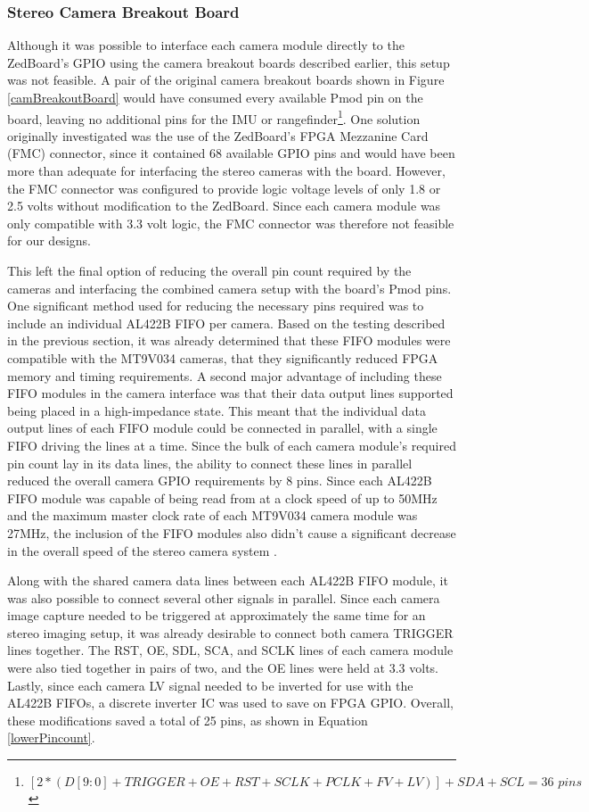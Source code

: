 \subsubsection{Stereo Camera Breakout Board}
Although it was possible to interface each camera module directly to the ZedBoard's GPIO using the camera breakout boards described earlier, this setup was not feasible. A pair of the original camera breakout boards shown in Figure \ref{camBreakoutBoard} would have consumed every available Pmod pin on the board, leaving no additional pins for the IMU or rangefinder\footnote{$[2*(D[9:0]+TRIGGER+OE+RST+SCLK+PCLK+FV+LV)]+SDA+SCL = 36\,\,pins$}. One solution originally investigated was the use of the ZedBoard's FPGA Mezzanine Card (FMC) connector, since it contained 68 available GPIO pins and would have been more than adequate for interfacing the stereo cameras with the board. However, the FMC connector was configured to provide logic voltage levels of only 1.8 or 2.5 volts without modification to the ZedBoard. Since each camera module was only compatible with 3.3 volt logic, the FMC connector was therefore not feasible for our designs.
\par
This left the final option of reducing the overall pin count required by the cameras and interfacing the combined camera setup with the board's Pmod pins. One significant method used for reducing the necessary pins required was to include an individual AL422B FIFO per camera. Based on the testing described in the previous section, it was already determined that these FIFO modules were compatible with the MT9V034 cameras, that they significantly reduced FPGA memory and timing requirements. A second major advantage of including these FIFO modules in the camera interface was that their data output lines supported being placed in a high-impedance state. This meant that the individual data output lines of each FIFO module could be connected in parallel, with a single FIFO driving the lines at a time. Since the bulk of each camera module's required pin count lay in its data lines, the ability to connect these lines in parallel reduced the overall camera GPIO requirements by 8 pins. Since each AL422B FIFO module was capable of being read from at a clock speed of up to 50MHz and the maximum master clock rate of each MT9V034 camera module was 27MHz, the inclusion of the FIFO modules also didn't cause a significant decrease in the overall speed of the stereo camera system \cite{al422b,mt9v034}.
\par
Along with the shared camera data lines between each AL422B FIFO module, it was also possible to connect several other signals in parallel. Since each camera image capture needed to be triggered at approximately the same time for an stereo imaging setup, it was already desirable to connect both camera TRIGGER lines together. The RST, OE, SDL, SCA, and SCLK lines of each camera module were also tied together in pairs of two, and the OE lines were held at 3.3 volts. Lastly, since each camera LV signal needed to be inverted for use with the AL422B FIFOs, a discrete inverter IC was used to save on FPGA GPIO. Overall, these modifications saved a total of 25 pins, as shown in Equation \ref{lowerPincount}.
